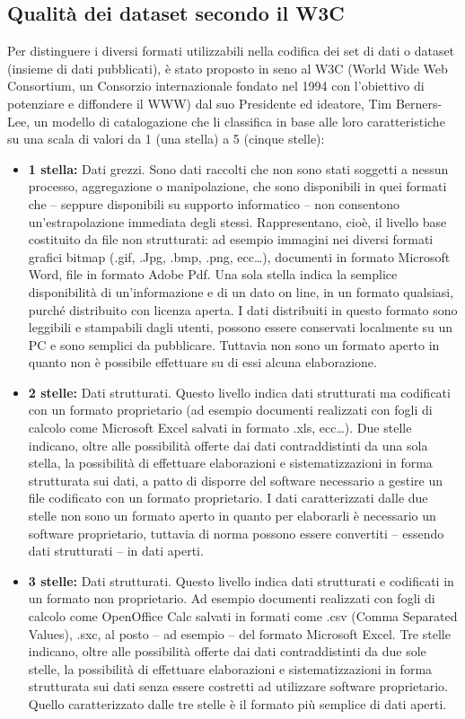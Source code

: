\documentclass{article}
\theoremstyle{plain}
\theoremstyle{definition}
\begin{document}
\subsection{Qualità dei dataset secondo il W3C}
Per distinguere i diversi formati utilizzabili nella codifica dei set di dati o dataset (insieme di dati pubblicati), è stato proposto in seno al W3C (World Wide Web Consortium, un Consorzio internazionale fondato nel 1994 con l'obiettivo di potenziare e diffondere il WWW) dal suo Presidente ed ideatore, Tim Berners-Lee, un modello di catalogazione che li classifica in base alle loro caratteristiche su una scala di valori da 1 (una stella) a 5 (cinque stelle):
\\
\begin{itemize}
\item \textbf{1 stella:} Dati grezzi. Sono dati raccolti che non sono stati soggetti a nessun processo, aggregazione o manipolazione, che sono disponibili in quei formati che – seppure disponibili su supporto informatico – non consentono un'estrapolazione immediata degli stessi. Rappresentano, cioè, il livello base costituito da file non strutturati: ad esempio immagini nei diversi formati grafici bitmap (.gif, .Jpg, .bmp, .png, ecc…), documenti in formato Microsoft Word, file in formato Adobe Pdf. Una sola stella indica la semplice disponibilità di un'informazione e di un dato on line, in un formato qualsiasi, purché distribuito con licenza aperta. I dati distribuiti in questo formato sono leggibili e stampabili dagli utenti, possono essere conservati localmente su un PC e sono semplici da pubblicare. Tuttavia non sono un formato aperto in quanto non è possibile effettuare su di essi alcuna elaborazione.

\item \textbf{2 stelle:} Dati strutturati. Questo livello indica dati strutturati ma codificati con un formato proprietario (ad esempio documenti realizzati con fogli di calcolo come Microsoft Excel salvati in formato .xls, ecc…). Due stelle indicano, oltre alle possibilità offerte dai dati contraddistinti da una sola stella, la possibilità di effettuare elaborazioni e sistematizzazioni in forma strutturata sui dati, a patto di disporre del software necessario a gestire un file codificato con un formato proprietario. I dati caratterizzati dalle due stelle non sono un formato aperto in quanto per elaborarli è necessario un software proprietario, tuttavia di norma possono essere convertiti – essendo dati strutturati – in dati aperti.

\item \textbf{3 stelle:} Dati strutturati. Questo livello indica dati strutturati e codificati in un formato non proprietario. Ad esempio documenti realizzati con fogli di calcolo come OpenOffice Calc salvati in formati come .csv (Comma Separated Values), .sxc, al posto – ad esempio – del formato Microsoft Excel. Tre stelle indicano, oltre alle possibilità offerte dai dati contraddistinti da due sole stelle, la possibilità di effettuare elaborazioni e sistematizzazioni in forma strutturata sui dati senza essere costretti ad utilizzare software proprietario. Quello caratterizzato dalle tre stelle è il formato più semplice di dati aperti.


\end{itemize}
\end{document}
